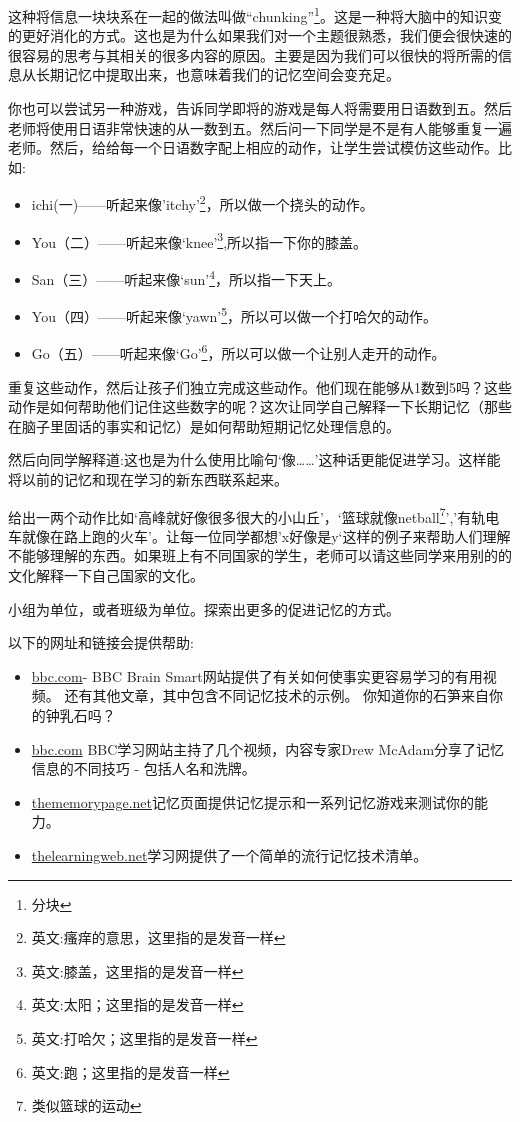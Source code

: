     这种将信息一块块系在一起的做法叫做“chunking”\footnote{分块}。这是一种将大脑中的知识变的更好消化的方式。这也是为什么如果我们对一个主题很熟悉，我们便会很快速的很容易的思考与其相关的很多内容的原因。主要是因为我们可以很快的将所需的信息从长期记忆中提取出来，也意味着我们的记忆空间会变充足。\par
    你也可以尝试另一种游戏，告诉同学即将的游戏是每人将需要用日语数到五。然后老师将使用日语非常快速的从一数到五。然后问一下同学是不是有人能够重复一遍老师。然后，给给每一个日语数字配上相应的动作，让学生尝试模仿这些动作。比如:\par
    \begin{itemize}
      \item ichi(一)——听起来像'itchy'\footnote{英文:瘙痒的意思，这里指的是发音一样}，所以做一个挠头的动作。
      \item You（二）——听起来像‘knee’\footnote{英文:膝盖，这里指的是发音一样},所以指一下你的膝盖。
      \item San（三）——听起来像‘sun’\footnote{英文:太阳；这里指的是发音一样}，所以指一下天上。
      \item You（四）——听起来像‘yawn’\footnote{英文:打哈欠；这里指的是发音一样}，所以可以做一个打哈欠的动作。
      \item Go（五）——听起来像‘Go’\footnote{英文:跑；这里指的是发音一样}，所以可以做一个让别人走开的动作。
    \end{itemize}  
    重复这些动作，然后让孩子们独立完成这些动作。他们现在能够从1数到5吗？这些动作是如何帮助他们记住这些数字的呢？这次让同学自己解释一下长期记忆（那些在脑子里固话的事实和记忆）是如何帮助短期记忆处理信息的。\par
    然后向同学解释道:这也是为什么使用比喻句‘像……’这种话更能促进学习。这样能将以前的记忆和现在学习的新东西联系起来。\par
    给出一两个动作比如‘高峰就好像很多很大的小山丘’，‘篮球就像netball\footnote{类似篮球的运动}’,'有轨电车就像在路上跑的火车'。让每一位同学都想’x好像是y‘这样的例子来帮助人们理解不能够理解的东西。如果班上有不同国家的学生，老师可以请这些同学来用别的的文化解释一下自己国家的文化。\par
    小组为单位，或者班级为单位。探索出更多的促进记忆的方式。\par
    以下的网址和链接会提供帮助:\par
    \begin{itemize}
       \item \href{http://www.bbc.co.uk/scotland/brainsmart/memory/}{bbc.com}- BBC Brain Smart网站提供了有关如何使事实更容易学习的有用视频。 还有其他文章，其中包含不同记忆技术的示例。 你知道你的石笋来自你的钟乳石吗？
       \item \href{http://www.bbc.co.uk/blogs/legacy/scotlandlearning/2010/04/make-themost-of-your-memory.shtml}{bbc.com} BBC学习网站主持了几个视频，内容专家Drew McAdam分享了记忆信息的不同技巧 - 包括人名和洗牌。
       \item \href{http://www.thememorypage.net/}{thememorypage.net}记忆页面提供记忆提示和一系列记忆游戏来测试你的能力。
       \item \href{http://www.thelearningweb.net/memory-tricks.html}{thelearningweb.net}学习网提供了一个简单的流行记忆技术清单。
    \end{itemize}  
